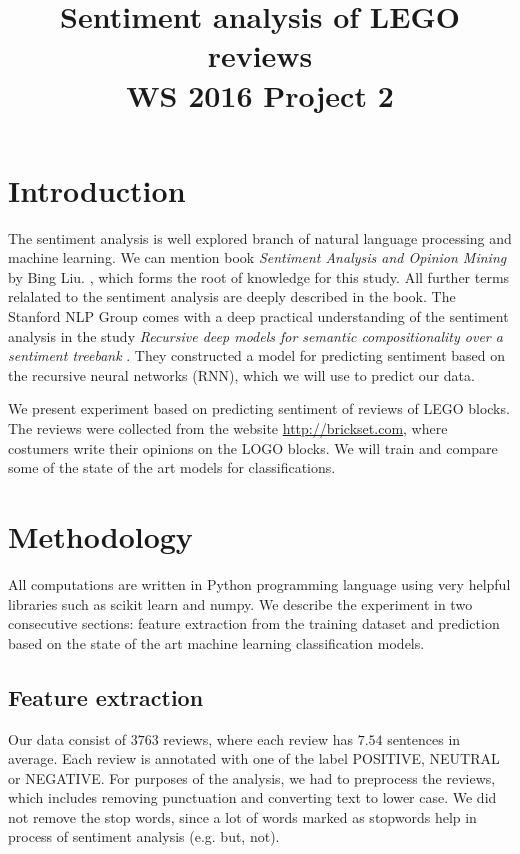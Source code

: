 \documentclass{sig-alternate}
\begin{document}
\title{Sentiment analysis of LEGO reviews\\WS 2016 Project 2}
\maketitle



\section{Introduction}
The sentiment analysis is well explored branch of natural language processing and machine learning.
We can mention book {\it Sentiment  Analysis  and  Opinion  Mining} by Bing  Liu. \cite{reading}, which forms the root of knowledge for this study.
All further terms relalated to the sentiment analysis are deeply described in the book.
The Stanford NLP Group \cite{stanfnlp} comes with a deep practical understanding of the sentiment analysis in the study {\it Recursive deep models for semantic compositionality over a sentiment treebank} \cite{stanford}.
They constructed a model for predicting sentiment based on the recursive neural networks (RNN), which we will use to predict our data.

We present experiment based on predicting sentiment of reviews of LEGO blocks.
The reviews were collected from the website \url{http://brickset.com}, where costumers write their opinions on the LOGO blocks.
We will train and compare some of the state of the art models for classifications.

\section{Methodology}
All computations are written in Python programming language using very helpful libraries such as scikit learn\cite{scikit} and numpy\cite{numpy}.
We describe the experiment in two consecutive sections: feature extraction from the training dataset and prediction based on the state of the art machine learning classification models.

\subsection{Feature extraction}
Our data consist of $3763$ reviews, where each review has $7.54$ sentences in average.
Each review is annotated with one of the label POSITIVE, NEUTRAL or NEGATIVE.
For purposes of the analysis, we had to preprocess the reviews, which includes removing punctuation and converting text to lower case.
We did not remove the stop words, since a lot of words marked as stopwords help in process of sentiment analysis \cite{reading} (e.g. but, not).
\end{document}

